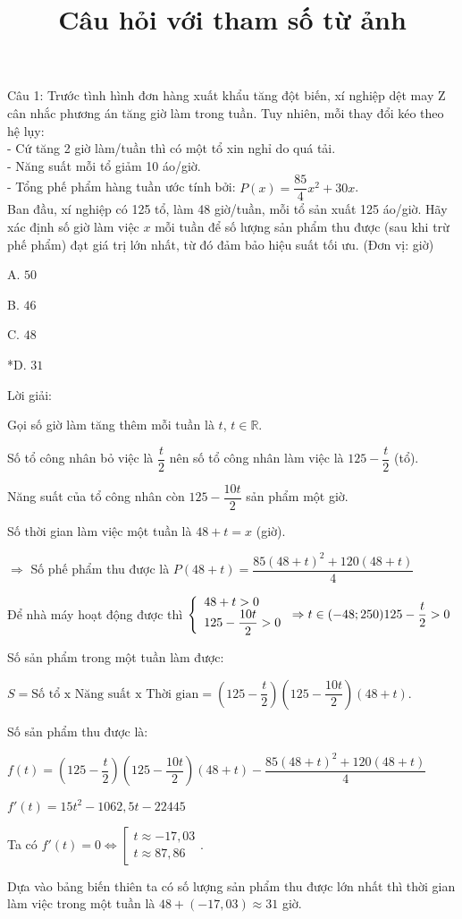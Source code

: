 \documentclass[a4paper,12pt]{article}
\begin{document}
\title{Câu hỏi với tham số từ ảnh}
\maketitle

Câu 1: Trước tình hình đơn hàng xuất khẩu tăng đột biến, xí nghiệp dệt may Z cân nhắc phương án tăng giờ làm trong tuần. Tuy nhiên, mỗi thay đổi kéo theo hệ lụy:\\- Cứ tăng 2 giờ làm/tuần thì có một tổ xin nghỉ do quá tải.\\- Năng suất mỗi tổ giảm 10 áo/giờ.\\- Tổng phế phẩm hàng tuần ước tính bởi: \( P(x) = \dfrac{85}{4}x^2 + 30x \).\\Ban đầu, xí nghiệp có 125 tổ, làm 48 giờ/tuần, mỗi tổ sản xuất 125 áo/giờ. Hãy xác định số giờ làm việc \(x\) mỗi tuần để số lượng sản phẩm thu được (sau khi trừ phế phẩm) đạt giá trị lớn nhất, từ đó đảm bảo hiệu suất tối ưu. (Đơn vị: giờ)

A. \(50\)

B. \(46\)

C. \(48\)

*D. \(31\)

Lời giải:


Gọi số giờ làm tăng thêm mỗi tuần là \(t\), \(t \in \mathbb{R}\).

Số tổ công nhân bỏ việc là \(\dfrac{t}{2}\) nên số tổ công nhân làm việc là \(125 - \dfrac{t}{2}\) (tổ).

Năng suất của tổ công nhân còn \(125 - \dfrac{10t}{2}\) sản phẩm một giờ.

Số thời gian làm việc một tuần là \(48 + t = x\) (giờ).

\(\Rightarrow\) Số phế phẩm thu được là \(P(48 + t) = \dfrac{85(48 + t)^2 + 120(48 + t)}{4}\)

Để nhà máy hoạt động được thì \(\left\{\begin{array}{l}48 + t > 0 \\ 125 - \dfrac{10t}{2} > 0\end{array}\right. \Rightarrow t \in(-48 ; 250) \\ 125 - \dfrac{t}{2} > 0\)

Số sản phẩm trong một tuần làm được:

\(S = \text{Số tổ x Năng suất x Thời gian} = \left(125 - \dfrac{t}{2}\right)\left(125 - \dfrac{10t}{2}\right)(48 + t)\).

Số sản phẩm thu được là:

\(f(t) = \left(125 - \dfrac{t}{2}\right)\left(125 - \dfrac{10t}{2}\right)(48 + t) - \dfrac{85(48 + t)^2 + 120(48 + t)}{4}\)

\(f'(t) = 15t^{2} - 1062,5t - 22445\)

Ta có \(f'(t) = 0 \Leftrightarrow \left[\begin{array}{l}t \approx -17,03 \\ t \approx 87,86\end{array}\right.\).

Dựa vào bảng biến thiên ta có số lượng sản phẩm thu được lớn nhất thì thời gian làm việc trong một tuần là \(48 + (-17,03) \approx 31\) giờ.
\end{document}
